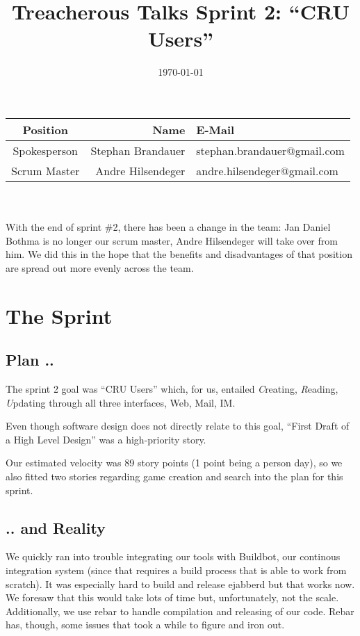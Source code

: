 \documentclass[11pt,a4paper]{article}
\begin{document}
\title{Treacherous Talks 
  Sprint 2: ``CRU Users''}
\date{\today}
\maketitle

\begin{tabular}{c|rl}
Position     & Name              & E-Mail \\
\hline
Spokesperson & Stephan Brandauer & stephan.brandauer@gmail.com \\
Scrum Master & Andre Hilsendeger & andre.hilsendeger@gmail.com
\end{tabular}
\\
\\
With the end of sprint \#2, there has been a change in the team:
Jan Daniel Bothma is no longer our scrum master, Andre Hilsendeger will
take over from him. We did this in the hope that the benefits and disadvantages
of that position are spread out more evenly across the team.

\section{The Sprint}
\subsection{Plan ..}
The sprint 2 goal was ``CRU Users'' which, for us, entailed {\it C}reating, {\it R}eading, {\it U}pdating through all three interfaces, Web, Mail, IM.

Even though software design does not directly relate to this goal, ``First Draft of a High Level Design'' was a high-priority story.

Our estimated velocity was 89 story points (1 point being a person day), so we 
also fitted two stories regarding game creation and search into the plan for 
this sprint.

\subsection{.. and Reality}

We quickly ran into trouble integrating our tools with Buildbot, our continous 
integration system (since that requires a build process that is able to work 
from scratch). It was especially hard to build and release ejabberd but that 
works now.
We foresaw that this would take lots of time but, unfortunately, not the scale.
Additionally, we use rebar to handle compilation and releasing of our code. 
Rebar has, though, some issues that took a while to figure and iron out.
\end{document}
